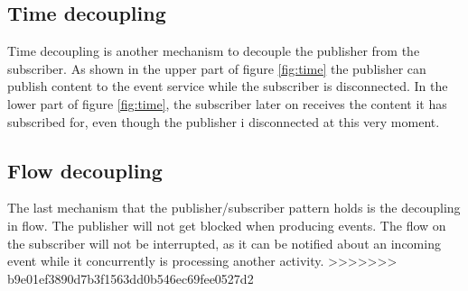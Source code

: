\subsection{Time decoupling}
Time decoupling is another mechanism to decouple the publisher from the subscriber. As shown in the upper part of figure \ref{fig:time} the publisher can publish content to the event service while the subscriber is disconnected. In the lower part of figure \ref{fig:time}, the subscriber later on receives the content it has subscribed for, even though the publisher i disconnected at this very moment.

\subsection{Flow decoupling}
The last mechanism that the publisher/subscriber pattern holds is the decoupling in flow. The publisher will not get blocked when producing events. The flow on the subscriber will not be interrupted, as it can be notified about an incoming event while it concurrently is processing another activity.
>>>>>>> b9e01ef3890d7b3f1563dd0b546ec69fee0527d2
